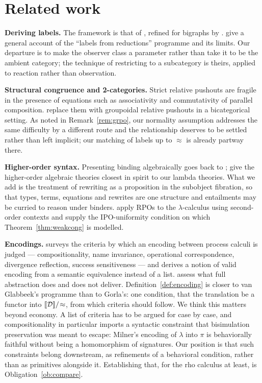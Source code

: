\documentclass{article}
\begin{document}
\section{Related work}
\label{sec:related}

\textbf{Deriving labels.} The framework is that of \citet{lm}, refined for bigraphs by \citet{bigraph-lts}. \citet{lux} give a general account of the ``labels from reductions'' programme and its limits. Our departure is to make the observer class a parameter rather than take it to be the ambient category; the technique of restricting to a subcategory is theirs, applied to reaction rather than observation.

\textbf{Structural congruence and 2-categories.} Strict relative pushouts are fragile in the presence of equations such as associativity and commutativity of parallel composition. \citet{grpo,grpo2} replace them with groupoidal relative pushouts in a bicategorical setting. As noted in Remark~\ref{rem:grpo}, our normality assumption addresses the same difficulty by a different route and the relationship deserves to be settled rather than left implicit; our matching of labels up to $\approx$ is already partway there.

\textbf{Higher-order syntax.} Presenting binding algebraically goes back to \citet{fpt}; \citet{hoat} give the higher-order algebraic theories closest in spirit to our lambda theories. What we add is the treatment of rewriting as a proposition in the subobject fibration, so that types, terms, equations and rewrites are one structure and entailments may be curried to reason under binders. \citet{lambda-lts} apply RPOs to the $\lambda$-calculus using second-order contexts and supply the IPO-uniformity condition on which Theorem~\ref{thm:weakcong} is modelled.

\textbf{Encodings.} \citet{gorla} surveys the criteria by which an encoding between process calculi is judged --- compositionality, name invariance, operational correspondence, divergence reflection, success sensitiveness --- and \citet{glabbeek} derives a notion of valid encoding from a semantic equivalence instead of a list. \citet{gorla-nestmann} assess what full abstraction does and does not deliver. Definition~\ref{def:encoding} is closer to van Glabbeek's programme than to Gorla's: one condition, that the translation be a functor into $[\![\mathcal{D}]\!]/\!\approx$, from which criteria should follow. We think this matters beyond economy. A list of criteria has to be argued for case by case, and compositionality in particular imports a syntactic constraint that bisimulation preservation was meant to escape: Milner's encoding of $\lambda$ into $\pi$ is behaviorally faithful without being a homomorphism of signatures. Our position is that such constraints belong downstream, as refinements of a behavioral condition, rather than as primitives alongside it. Establishing that, for the rho calculus at least, is Obligation~\ref{ob:compare}.
\end{document}
